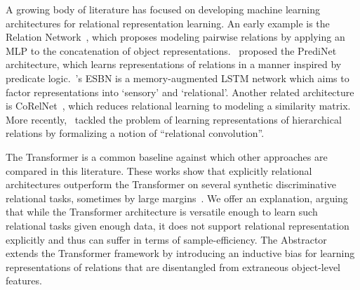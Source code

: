 
% 

A growing body of literature has focused on developing machine learning architectures for relational representation learning. An early example is the Relation Network~\citep{santoro1}, which proposes modeling pairwise relations by applying an MLP to the concatenation of object representations.~\citet{shanahanExplicitlyRelationalNeural} proposed the PrediNet architecture, which learns representations of relations in a manner inspired by predicate logic.~\citet{esbn}'s ESBN is a memory-augmented LSTM network which aims to factor representations into `sensory' and `relational'. Another related architecture is CoRelNet~\citep{kerg2022neural}, which reduces relational learning to modeling a similarity matrix. More recently,~\citet{altabaaRelationalConvolutionalNetworks2023} tackled the problem of learning representations of hierarchical relations by formalizing a notion of ``relational convolution''.

The Transformer is a common baseline against which other approaches are compared in this literature. These works show that explicitly relational architectures outperform the Transformer on several synthetic discriminative relational tasks, sometimes by large margins~\citep{shanahanExplicitlyRelationalNeural,esbn,kerg2022neural,altabaaRelationalConvolutionalNetworks2023}. We offer an explanation, arguing that while the Transformer architecture is versatile enough to learn such relational tasks given enough data, it does not support relational representation explicitly and thus can suffer in terms of sample-efficiency. The Abstractor extends the Transformer framework by introducing an inductive bias for learning representations of relations that are disentangled from extraneous object-level features.

